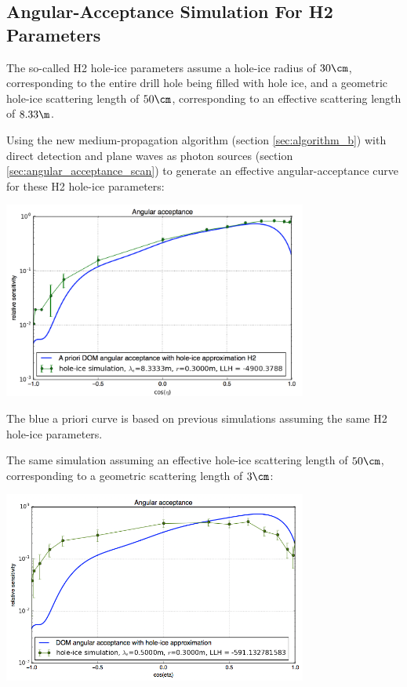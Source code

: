 
\subsection{Angular-Acceptance Simulation For H2 Parameters}
\label{sec:angular_acceptance_simulation_for_h2_parameters}

The so-called H2 hole-ice parameters assume a hole-ice radius of $30\cm$, corresponding to the entire drill hole being filled with hole ice, and a geometric hole-ice scattering length of $50\cm$, corresponding to an effective scattering length of $8.33\m$. \cite{holeicestudieswithyag}

Using the new medium-propagation algorithm (section \ref{sec:algorithm_b}) with direct detection and plane waves as photon sources (section \ref{sec:angular_acceptance_scan}) to generate an effective angular-acceptance curve for these H2 hole-ice parameters:

\hspace{1cm}
\begin{center}
  \includegraphics[width=0.75\textwidth]{img/angular-acceptance-karle-h2-vs-reference}
\end{center}
\hspace{1cm}


The blue a priori curve is based on previous \photonics simulations assuming the same H2 hole-ice parameters. \cite{lundberg, icepaper}

\newpage

The same simulation assuming an effective hole-ice scattering length of $50\cm$, corresponding to a geometric scattering length of $3\cm$:

\hspace{1cm}
\begin{center}
  \includegraphics[width=0.75\textwidth]{img/angular-acceptance-karle-h2-assuming-esca}
\end{center}
\hspace{1cm}

